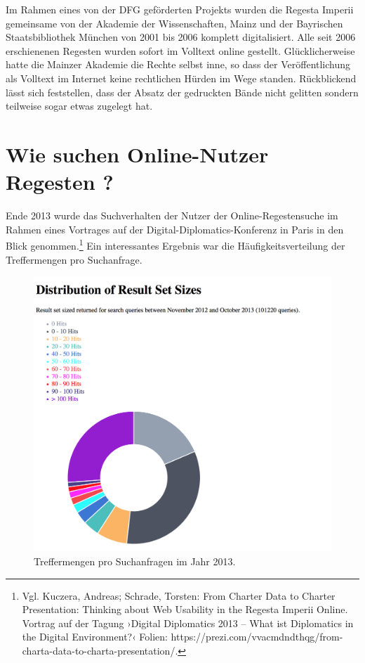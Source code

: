 \documentclass[ngerman,]{scrreprt}
\begin{document}
Im Rahmen eines von der DFG geförderten Projekts wurden die Regesta Imperii gemeinsame von der Akademie der Wissenschaften, Mainz und der Bayrischen Staatsbibliothek München von 2001 bis 2006 komplett digitalisiert. Alle seit 2006 erschienenen Regesten wurden sofort im Volltext online gestellt. Glücklicherweise hatte die Mainzer Akademie die Rechte selbst inne, so dass der Veröffentlichung als Volltext im Internet keine rechtlichen Hürden im Wege standen. Rückblickend lässt sich feststellen, dass der Absatz der gedruckten Bände nicht gelitten sondern teilweise sogar etwas zugelegt hat.

\hypertarget{wie-suchen-online-nutzer-regesten}{%
\section{Wie suchen Online-Nutzer Regesten ?}\label{wie-suchen-online-nutzer-regesten}}

Ende 2013 wurde das Suchverhalten der Nutzer der Online-Regestensuche im Rahmen eines Vortrages auf der Digital-Diplomatics-Konferenz in Paris in den Blick genommen.\footnote{Vgl. Kuczera, Andreas; Schrade, Torsten: From Charter Data to Charter Presentation: Thinking about Web Usability in the Regesta Imperii Online. Vortrag auf der Tagung ›Digital Diplomatics 2013 -- What ist Diplomatics in the Digital Environment?‹ Folien: https://prezi.com/vvacmdndthqg/from-charta-data-to-charta-presentation/.} Ein interessantes Ergebnis war die Häufigkeitsverteilung der Treffermengen pro Suchanfrage.

\begin{figure}
\centering
\includegraphics{Bilder/2012-Nutzungsformen_der_RI.png}
\caption{Treffermengen pro Suchanfragen im Jahr 2013.}
\label{treffermengen}
\end{figure}
\end{document}
